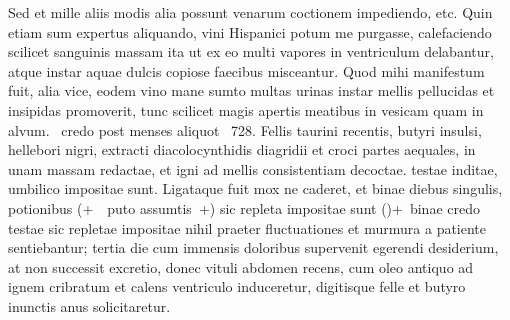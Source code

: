 Sed et mille aliis modis alia possunt
venarum 
coctionem impediendo, etc.
Quin etiam sum expertus aliquando, vini Hispanici potum me purgasse, calefaciendo scilicet sanguinis massam ita ut ex eo multi vapores in ventriculum delabantur, atque instar aquae dulcis copiose faecibus misceantur. Quod mihi manifestum fuit,
alia vice, eodem vino mane sumto multas urinas instar mellis pellucidas et insipidas promoverit, tunc scilicet magis apertis meatibus in vesicam quam in alvum.
\pend%
\pstart%
%
%
%
%
~credo post menses aliquot~%
%
728.
Fellis taurini recentis, butyri insulsi, hellebori nigri, extracti diacolocynthidis diagridii et croci partes aequales, in unam massam redactae, et igni ad mellis consistentiam decoctae.
testae inditae, umbilico impositae sunt.
Ligataque fuit mox ne caderet, et binae
diebus singulis, potionibus
(+~\Denarius\ puto assumtis~+)
sic repleta impositae sunt
(\phantom)\hspace{-1.2mm}+~binae credo testae sic repletae impositae
nihil praeter fluctuationes et murmura a patiente sentiebantur; tertia die cum immensis doloribus supervenit egerendi desiderium, at
non successit excretio, donec vituli abdomen recens, cum oleo antiquo ad ignem cribratum et calens ventriculo induceretur, digitisque felle et butyro inunctis anus solicitaretur.
\pend%
\count{}
\count{}
\count{}
